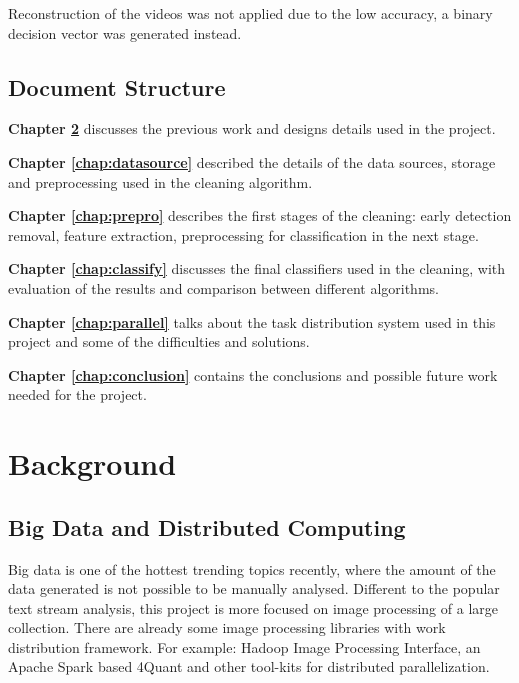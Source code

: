 \documentclass[bsc,logo,twoside,fullspacing,parskip]{infthesis}
\begin{document}
Reconstruction of the videos was not applied due to the low accuracy, a binary decision vector was generated instead.

\section{Document Structure}

\textbf{Chapter \ref{chap:bg}} discusses the previous work and designs details used in the project. 

\textbf{Chapter \ref{chap:datasource}} described the details of the data sources, storage and preprocessing used in the cleaning algorithm.

\textbf{Chapter \ref{chap:prepro}} describes the first stages of the cleaning: early detection removal, feature extraction, preprocessing for classification in the next stage.

\textbf{Chapter \ref{chap:classify}} discusses the final classifiers used in the cleaning, with evaluation of the results and comparison between different algorithms. 


\textbf{Chapter \ref{chap:parallel}} talks about the task distribution system used in this project and some of the difficulties and solutions.

\textbf{Chapter \ref{chap:conclusion}} contains the conclusions and possible future work needed for the project.
\newpage


\chapter{Background}
\label{chap:bg}

\section{Big Data and Distributed Computing}

Big data is one of the hottest trending topics recently, where the amount of the data generated is not possible to be manually analysed. 
Different to the popular text stream analysis, this project is more focused on image processing of a large collection. 
There are already some image processing libraries with work distribution framework. For example: Hadoop Image Processing Interface\cite{L3}, an Apache Spark based 4Quant\cite{L4} and other tool-kits for distributed parallelization.
\end{document}
